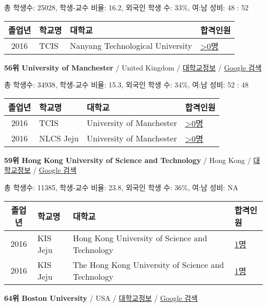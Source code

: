 \documentclass[13pt,]{article}
\begin{document}
총 학생수: 25028, 학생-교수 비율: 16.2, 외국인 학생 수: 33\%, 여:남
성비: 48 : 52

\begin{longtable}[]{@{}clll@{}}
\toprule
졸업년 & 학교명 & 대학교 & 합격인원\tabularnewline
\midrule
\endhead
2016 & TCIS & Nanyang Technological University &
\href{http://cafe.naver.com/assarabia/11598}{\textgreater{}0명}\tabularnewline
\bottomrule
\end{longtable}

\textbf{56위 University of Manchester} / United Kingdom /
\href{https://www.timeshighereducation.com/world-university-rankings/university-of-manchester?ranking-dataset=133819}{대학교정보}
/ \href{http://www.google.com/search?q=University+of+Manchester}{Google
검색}

총 학생수: 34938, 학생-교수 비율: 15.3, 외국인 학생 수: 34\%, 여:남
성비: 52 : 48

\begin{longtable}[]{@{}clll@{}}
\toprule
졸업년 & 학교명 & 대학교 & 합격인원\tabularnewline
\midrule
\endhead
2016 & TCIS & University of Manchester &
\href{http://cafe.naver.com/assarabia/11598}{\textgreater{}0명}\tabularnewline
2016 & NLCS Jeju & University of Manchester &
\href{http://cafe.naver.com/assarabia/11592}{\textgreater{}0명}\tabularnewline
\bottomrule
\end{longtable}

\textbf{59위 Hong Kong University of Science and Technology} / Hong Kong
/
\href{https://www.timeshighereducation.com/world-university-rankings/hong-kong-university-of-science-and-technology?ranking-dataset=133819}{대학교정보}
/
\href{http://www.google.com/search?q=Hong+Kong+University+of+Science+and+Technology}{Google
검색}

총 학생수: 11385, 학생-교수 비율: 23.8, 외국인 학생 수: 36\%, 여:남
성비: NA

\begin{longtable}[]{@{}clll@{}}
\toprule
졸업년 & 학교명 & 대학교 & 합격인원\tabularnewline
\midrule
\endhead
2016 & KIS Jeju & Hong Kong University of Science and Technology &
\href{http://cafe.naver.com/assarabia/11596}{1명}\tabularnewline
2016 & KIS Jeju & The Hong Kong University of Science and Technology &
\href{http://cafe.naver.com/assarabia/11596}{1명}\tabularnewline
\bottomrule
\end{longtable}

\textbf{64위 Boston University} / USA /
\href{https://www.timeshighereducation.com/world-university-rankings/boston-university?ranking-dataset=133819}{대학교정보}
/ \href{http://www.google.com/search?q=Boston+University}{Google 검색}
\end{document}
